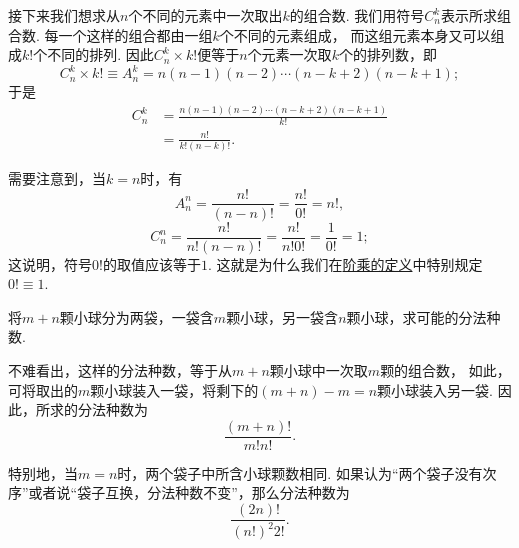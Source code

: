 接下来我们想求从\(n\)个不同的元素中一次取出\(k\)的组合数.
我们用符号\(C_n^k\)表示所求组合数.
每一个这样的组合都由一组\(k\)个不同的元素组成，
而这组元素本身又可以组成\(k!\)个不同的排列.
因此\(C_n^k \times k!\)便等于\(n\)个元素一次取\(k\)个的排列数，即\begin{equation*}
	C_n^k \times k! \equiv A_n^k
	= n(n-1)(n-2)\dotsm(n-k+2)(n-k+1);
\end{equation*}于是\begin{align}
	C_n^k &= \frac{n(n-1)(n-2)\dotsm(n-k+2)(n-k+1)}{k!} \\
	&= \frac{n!}{k! (n-k)!}.
\end{align}

需要注意到，当\(k=n\)时，有\begin{equation*}
	A_n^n = \frac{n!}{(n-n)!} = \frac{n!}{0!} = n!,
\end{equation*}\begin{equation*}
	C_n^n = \frac{n!}{n! (n-n)!} = \frac{n!}{n! 0!} = \frac{1}{0!} = 1;
\end{equation*}
这说明，符号\(0!\)的取值应该等于\(1\).
这就是为什么我们在\hyperref[definition:数列.阶乘的定义]{阶乘的定义}中特别规定\(0!\equiv1\).

\begin{example}
将\(m+n\)颗小球分为两袋，一袋含\(m\)颗小球，另一袋含\(n\)颗小球，求可能的分法种数.
\begin{solution}
不难看出，这样的分法种数，等于从\(m+n\)颗小球中一次取\(m\)颗的组合数，
如此，可将取出的\(m\)颗小球装入一袋，将剩下的\((m+n)-m=n\)颗小球装入另一袋.
因此，所求的分法种数为\begin{equation*}
	\frac{(m+n)!}{m! n!}.
\end{equation*}

特别地，当\(m=n\)时，两个袋子中所含小球颗数相同.
如果认为“两个袋子没有次序”或者说“袋子互换，分法种数不变”，那么分法种数为\begin{equation*}
	\frac{(2n)!}{(n!)^2 2!}.
\end{equation*}
\end{solution}
\end{example}


